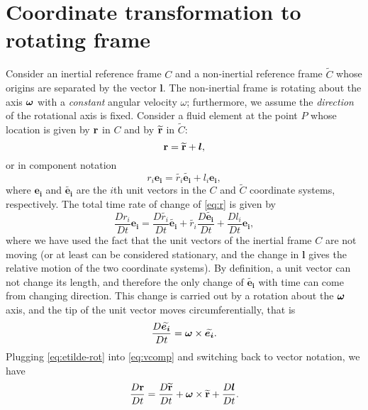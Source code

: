 \section{Coordinate transformation to rotating frame}
Consider an inertial reference frame \(C\) and a non-inertial
reference frame \(\widetilde{C}\) whose origins are separated by the
vector \(\boldsymbol{l}\).  The non-inertial frame is rotating about the axis
\(\boldsymbol{\omega}\) with a \emph{constant} angular velocity \(\omega\);
furthermore, we assume the \emph{direction} of the rotational axis is
fixed.  Consider a fluid element at the point \(P\) whose location is
given by \({\bf r}\) in \(C\) and by \(\widetilde{{\bf r}}\) in
\(\widetilde{C}\):
  \begin{equation}
    {\bf r} = \widetilde{{\bf r}} + \boldsymbol{l},
  \end{equation}
or in component notation
  \begin{equation}\label{eq:r}
    r_i\boldsymbol{e_i} = \widetilde{r_i}\widetilde{\boldsymbol{e_i}} + l_i\boldsymbol{e_i},
  \end{equation}
where \(\boldsymbol{e_i}\) and \(\widetilde{\boldsymbol{e_i}}\) are the \(i\)th unit
vectors in the \(C\) and \(\widetilde{C}\) coordinate systems,
respectively.  The total time rate of change of \ref{eq:r} is given by
  \begin{equation}\label{eq:vcomp}
    \frac{Dr_i}{Dt}\boldsymbol{e_i} = \frac{D\widetilde{r_i}}{Dt}\widetilde{\boldsymbol{e_i}} + \widetilde{r_i}\frac{D\widetilde{\boldsymbol{e_i}}}{Dt} + \frac{Dl_i}{Dt}\boldsymbol{e_i},
  \end{equation}
where we have used the fact that the unit vectors of the inertial
frame \(C\) are not moving (or at least can be considered stationary,
and the change in \(\boldsymbol{l}\) gives the relative motion of the two
coordinate systems).  By definition, a unit vector can not change its
length, and therefore the only change of \(\widetilde{\boldsymbol{e_i}}\) with
time can come from changing direction.  This change is carried out by
a rotation about the \(\boldsymbol{\omega}\) axis, and the tip of the unit
vector moves circumferentially, that is
  \begin{equation}\label{eq:etilde-rot}
    \frac{D\widetilde{\boldsymbol{e_i}}}{Dt} = \boldsymbol{\omega}\times\widetilde{\boldsymbol{e_i}}.
  \end{equation}
Plugging \ref{eq:etilde-rot} into \ref{eq:vcomp} and switching back to
vector notation, we have
  \begin{equation}\label{eq:r-dot}
    \frac{D{\bf r}}{Dt} = \frac{D\widetilde{{\bf r}}}{Dt} + \boldsymbol{\omega}\times\widetilde{{\bf r}} + \frac{D\boldsymbol{l}}{Dt}.
  \end{equation}
